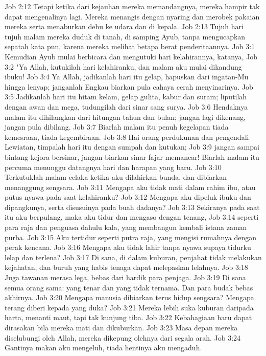 Job 2:12  Tetapi ketika dari kejauhan mereka memandangnya, mereka hampir tak dapat mengenalinya lagi. Mereka menangis dengan nyaring dan merobek pakaian mereka serta menaburkan debu ke udara dan di kepala.
Job 2:13  Tujuh hari tujuh malam mereka duduk di tanah, di samping Ayub, tanpa mengucapkan sepatah kata pun, karena mereka melihat betapa berat penderitaannya.
Job 3:1  Kemudian Ayub mulai berbicara dan mengutuki hari kelahirannya, katanya,
Job 3:2  "Ya Allah, kutukilah hari kelahiranku, dan malam aku mulai dikandung ibuku!
Job 3:4  Ya Allah, jadikanlah hari itu gelap, hapuskan dari ingatan-Mu hingga lenyap; janganlah Engkau biarkan pula cahaya cerah menyinarinya.
Job 3:5  Jadikanlah hari itu hitam kelam, gelap gulita, kabur dan suram; liputilah dengan awan dan mega, tudungilah dari sinar sang surya.
Job 3:6  Hendaknya malam itu dihilangkan dari hitungan tahun dan bulan; jangan lagi dikenang, jangan pula dibilang.
Job 3:7  Biarlah malam itu penuh kegelapan tiada kemesraan, tiada kegembiraan.
Job 3:8  Hai orang perdukunan dan pengendali Lewiatan, timpalah hari itu dengan sumpah dan kutukan;
Job 3:9  jangan sampai bintang kejora bersinar, jangan biarkan sinar fajar memancar! Biarlah malam itu percuma menunggu datangnya hari dan harapan yang baru.
Job 3:10  Terkutuklah malam celaka ketika aku dilahirkan bunda, dan dibiarkan menanggung sengsara.
Job 3:11  Mengapa aku tidak mati dalam rahim ibu, atau putus nyawa pada saat kelahiranku?
Job 3:12  Mengapa aku dipeluk ibuku dan dipangkunya, serta disusuinya pada buah dadanya?
Job 3:13  Sekiranya pada saat itu aku berpulang, maka aku tidur dan mengaso dengan tenang,
Job 3:14  seperti para raja dan penguasa dahulu kala, yang membangun kembali istana zaman purba.
Job 3:15  Aku tertidur seperti putra raja, yang mengisi rumahnya dengan perak kencana.
Job 3:16  Mengapa aku tidak lahir tanpa nyawa supaya tidurku lelap dan terlena?
Job 3:17  Di sana, di dalam kuburan, penjahat tidak melakukan kejahatan, dan buruh yang habis tenaga dapat melepaskan lelahnya.
Job 3:18  Juga tawanan merasa lega, bebas dari hardik para penjaga.
Job 3:19  Di sana semua orang sama: yang tenar dan yang tidak ternama. Dan para budak bebas akhirnya.
Job 3:20  Mengapa manusia dibiarkan terus hidup sengsara? Mengapa terang diberi kepada yang duka?
Job 3:21  Mereka lebih suka kuburan daripada harta, menanti maut, tapi tak kunjung tiba.
Job 3:22  Kebahagiaan baru dapat dirasakan bila mereka mati dan dikuburkan.
Job 3:23  Masa depan mereka diselubungi oleh Allah, mereka dikepung olehnya dari segala arah.
Job 3:24  Gantinya makan aku mengeluh, tiada hentinya aku mengaduh.
